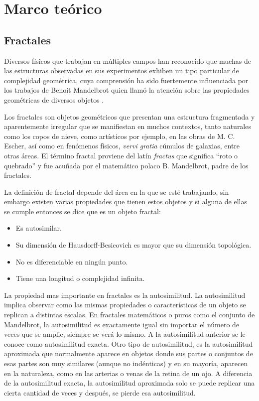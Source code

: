 \chapter{Marco te\'{o}rico}

\section{Fractales}

Diversos f\'{i}sicos que trabajan en m\'{u}ltiples campos han reconocido que muchas de las estructuras observadas en sus experimentos exhiben un tipo particular de complejidad geom\'{e}trica, cuya comprensi\'{o}n ha sido fuertemente influenciada por los trabajos de Benoit Mandelbrot quien llam\'{o} la atenci\'{o}n sobre las propiedades geom\'{e}tricas de diversos objetos \cite{Vicsek1992}.

Los fractales son objetos geom\'{e}tricos que presentan una estructura fragmentada y aparentemente irregular que se manifiestan en muchos contextos, tanto naturales como los copos de nieve, como art\'{i}sticos por ejemplo, en las obras de M. C. Escher, as\'{i} como en fen\'{o}menos f\'{i}sicos, \textit{vervi gratia} c\'{u}mulos de galaxias, entre otras \'{a}reas. El t\'{e}rmino fractal  proviene del lat\'{i}n \textit{fractus} que significa ``roto o quebrado'' y fue acuñada por el matem\'{a}tico polaco B. Mandelbrot, padre de los fractales.

La definici\'{o}n de fractal depende del \'{a}rea en la que se est\'{e} trabajando, sin embargo existen varias propiedades que tienen estos objetos y si alguna de ellas se cumple entonces se dice que es un objeto fractal:

\begin{itemize}
	\item Es autosimilar.
	\item Su dimensi\'{o}n de Hausdorff-Besicovich es mayor que su dimensi\'{o}n topol\'{o}gica.
	\item No es diferenciable en ning\'{u}n punto.
	\item Tiene una longitud o complejidad infinita.
\end{itemize}

La  propiedad mas importante en fractales es la autosimilitud. La autosimilitud implica observar como las mismas propiedades o caracter\'{i}sticas de un objeto se replican a distintas escalas. En fractales matem\'{a}ticos o puros como el conjunto de Mandelbrot, la autosimilitud es exactamente igual sin importar el n\'{u}mero de veces que se amplie, siempre se ver\'{a} lo mismo. A la autosimilitud anterior se le conoce como autosimilitud exacta. Otro tipo de autosimilitud, es la autosimilitud aproximada que normalmente aparece en objetos donde sus partes o conjuntos de esas partes son muy similares (aunque no ind\'{e}nticas) y en su mayor\'{i}a, aparecen en la naturaleza, como en las arterias o venas de la retina de un ojo. A diferencia de la autosimilitud exacta, la autosimilitud aproximada solo se puede replicar una cierta cantidad de veces y despu\'{e}s, se pierde esa autosimilitud.

